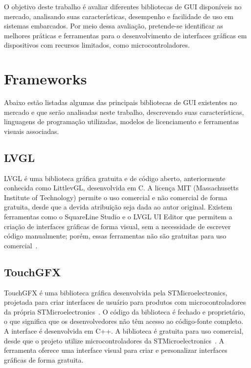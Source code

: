 O objetivo deste trabalho é avaliar diferentes bibliotecas de GUI disponíveis no mercado, analisando suas características, desempenho e facilidade de uso em sistemas embarcados. Por meio dessa avaliação, pretende-se identificar as melhores práticas e ferramentas para o desenvolvimento de interfaces gráficas em dispositivos com recursos limitados, como microcontroladores.

\section{Frameworks}

Abaixo estão listadas algumas das principais bibliotecas de GUI existentes no mercado e que serão analisadas neste trabalho, descrevendo suas características, linguagens de programação utilizadas, modelos de licenciamento e ferramentas visuais associadas.

\subsection{LVGL}
LVGL é uma biblioteca gráfica gratuita e de código aberto, anteriormente conhecida como LittlevGL, desenvolvida em C. A licença MIT (Massachusetts Institute of Technology) permite o uso comercial e não comercial de forma gratuita, desde que a devida atribuição seja dada ao autor original. Existem ferramentas como o SquareLine Studio e o LVGL UI Editor que permitem a criação de interfaces gráficas de forma visual, sem a necessidade de escrever código manualmente; porém, essas ferramentas não são gratuitas para uso comercial~\cite{lvgl-docs}.

\subsection{TouchGFX}
TouchGFX é uma biblioteca gráfica desenvolvida pela STMicroelectronics, projetada para criar interfaces de usuário para produtos com microcontroladores da própria STMicroelectronics~\cite{touchgfx-docs}. O código da biblioteca é fechado e proprietário, o que significa que os desenvolvedores não têm acesso ao código-fonte completo. A interface é desenvolvida em C++. A biblioteca é gratuita para uso comercial, desde que o projeto utilize microcontroladores da STMicroelectronics~\cite{st-touchgfx-license-4-21}. A ferramenta oferece uma interface visual para criar e personalizar interfaces gráficas de forma gratuita.

